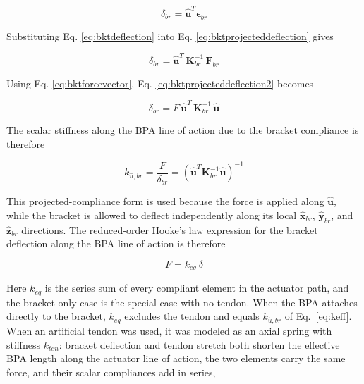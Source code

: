 \begin{equation}
{\delta}_{br} = \hat{\mathbf{u}}^{T} \boldsymbol{\epsilon}_{br}
\label{eq:bktprojecteddeflection}
\end{equation}

Substituting Eq. \ref{eq:bktdeflection} into Eq. \ref{eq:bktprojecteddeflection} gives

\begin{equation}
{\delta}_{br} = \hat{\mathbf{u}}^{T} \, \mathbf{K}_{br}^{-1} \, \mathbf{F}_{br}
\label{eq:bktprojecteddeflection2}
\end{equation}

Using Eq. \ref{eq:bktforcevector}, Eq. \ref{eq:bktprojecteddeflection2} becomes

\begin{equation}
\delta_{br} = F\, \hat{\mathbf{u}}^{T} \, \mathbf{K}_{br}^{-1} \, \hat{\mathbf{u}}
\label{eq:bktprojectedcompliance}
\end{equation}

The scalar stiffness along the BPA line of action due to the bracket compliance is therefore

\begin{equation}
k_{\hat{u},br} = \frac{F}{\delta_{br}} = \left( \hat{\mathbf{u}}^{T} \mathbf{K}_{br}^{-1} \hat{\mathbf{u}} \right)^{-1}
\label{eq:keff}
\end{equation}

This projected-compliance form is used because the force is applied along $\hat{\mathbf{u}}$, while the bracket is allowed to deflect independently along its local $\hat{\mathbf{x}}_{br}$, $\hat{\mathbf{y}}_{br}$, and $\hat{\mathbf{z}}_{br}$ directions. The reduced-order Hooke's law expression for the bracket deflection along the BPA line of action is therefore

\begin{equation} F = k_{eq} \: \delta
\label{eq:hookereduced}
\end{equation}

Here $k_{eq}$ is the series sum of every compliant element in the actuator path, and the bracket-only case is the special case with no tendon. When the BPA attaches directly to the bracket, $k_{eq}$ excludes the tendon and equals $k_{\hat{u},br}$ of Eq.~\eqref{eq:keff}. When an artificial tendon was used, it was modeled as an axial spring with stiffness $k_{ten}$: bracket deflection and tendon stretch both shorten the effective BPA length along the actuator line of action, the two elements carry the same force, and their scalar compliances add in series,

